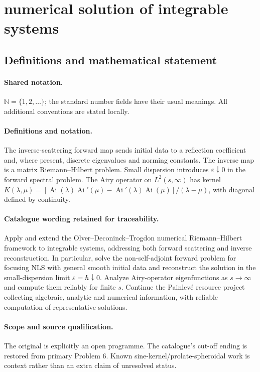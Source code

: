 \documentclass[11pt]{article}
\begin{document}
\section{numerical solution of integrable systems}\label{statement}

\subsection{Definitions and mathematical statement}

\paragraph{Shared notation.}$\mathbb N=\{1,2,\ldots\}$; the standard number fields have their usual meanings. All additional conventions are stated locally.


\paragraph{Definitions and notation.}The inverse-scattering forward map sends initial data to a reflection coefficient and, where present, discrete eigenvalues and norming constants. The inverse map is a matrix Riemann--Hilbert problem. Small dispersion introduces $\varepsilon\downarrow0$ in the forward spectral problem. The Airy operator on $L^2(s,\infty)$ has kernel $K(\lambda,\mu)=[\operatorname{Ai}(\lambda)\operatorname{Ai}'(\mu)-\operatorname{Ai}'(\lambda)\operatorname{Ai}(\mu)]/(\lambda-\mu)$, with diagonal defined by continuity.

\paragraph{Catalogue wording retained for traceability.}
Apply and extend the Olver--Deconinck--Trogdon numerical Riemann--Hilbert framework to integrable systems, addressing both forward scattering and inverse reconstruction. In particular, solve the non-self-adjoint forward problem for focusing NLS with general smooth initial data and reconstruct the solution in the small-dispersion limit $\varepsilon=\hbar\downarrow0$. Analyze Airy-operator eigenfunctions as $s\to\infty$ and compute them reliably for finite $s$. Continue the Painlevé resource project collecting algebraic, analytic and numerical information, with reliable computation of representative solutions.
\paragraph{Scope and source qualification.}The original is explicitly an open programme. The catalogue’s cut-off ending is restored from primary Problem 6. Known sine-kernel/prolate-spheroidal work is context rather than an extra claim of unresolved status.
\end{document}
